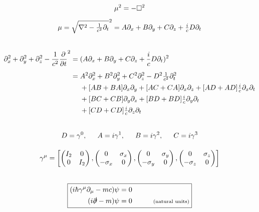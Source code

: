 \documentclass[12pt]{article}
\begin{document}
\begin{gather*}
    \mu^2 = - \square^2\\[5pt]
    \mu = \sqrt{\nabla^2 - \tfrac{1}{c^2} \partial_t}^2     
        = A \partial_x + B \partial_y + C \partial_z + \tfrac{i}{c} D \partial_t\\[20pt]
    \begin{aligned}
        \partial_x^2 + \partial_y^2 + \partial_z^2 - \frac{1}{c^2} \frac{\partial}{\partial t}^2 &= 
            (A \partial_x + B \partial_y + C \partial_z + \frac{i}{c} D \partial_t)^2\\[5pt]   
        &= \begin{aligned}[t]
            &A^2 \partial_x^2 + B^2 \partial_y^2 + C^2 \partial_z^2 - D^2 \tfrac{1}{c^2} \partial_t^2\\
            &+ [AB+BA]\partial_x\partial_y + [AC+CA]\partial_x\partial_z + [AD+AD]\tfrac{i}{c}\partial_x\partial_t\\
            &+ [BC+CB]\partial_y\partial_z + [BD+BD]\tfrac{i}{c}\partial_y\partial_t\\
            &+ [CD+CD]\tfrac{i}{c}\partial_z\partial_t
        \end{aligned}
    \end{aligned}\\[20pt]
    D=\gamma^0, \indent A=i\gamma^1, \indent B=i\gamma^2, \indent C=i\gamma^3\\[10pt]
    \gamma^\mu = \left[ 
        \left(\begin{matrix}
            I_2 & 0\\
            0 & I_2
        \end{matrix}\right),  
        \left(\begin{matrix}
            0 & \sigma_x\\
            -\sigma_x & 0
        \end{matrix}\right),  
        \left(\begin{matrix}
            0 & \sigma_y\\
            -\sigma_y & 0
        \end{matrix}\right), 
        \left(\begin{matrix}
            0 & \sigma_z\\
            -\sigma_z & 0
        \end{matrix}\right)
        \right]\\[20pt]
    \boxed{ \begin{aligned}
        (i\hbar \gamma^\mu \partial_\mu - mc) \psi &= 0\\
        (i \slashed{\partial} - m)\psi &= 0 \indent \indent \text{\scriptsize(natural units)}
    \end{aligned} }
\end{gather*}
\end{document}
